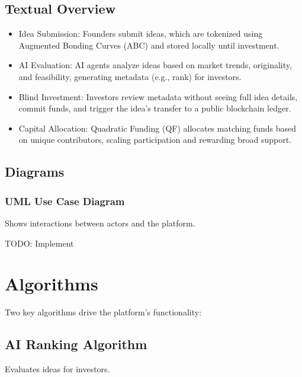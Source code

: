 \documentclass[12pt]{article}
\begin{document}
\subsection{Textual Overview}
\begin{itemize}
  \item Idea Submission: Founders submit ideas, which are tokenized using Augmented Bonding Curves (ABC) and stored locally until investment.
  \item AI Evaluation: AI agents analyze ideas based on market trends, originality, and feasibility, generating metadata (e.g., rank) for investors.
  \item Blind Investment: Investors review metadata without seeing full idea details, commit funds, and trigger the idea's transfer to a public blockchain ledger.
  \item Capital Allocation: Quadratic Funding (QF) allocates matching funds based on unique contributors, scaling participation and rewarding broad support.
\end{itemize}

\subsection{Diagrams}

\subsubsection{UML Use Case Diagram}
Shows interactions between actors and the platform.

TODO: Implement

\section{Algorithms}

Two key algorithms drive the platform's functionality:

\subsection{AI Ranking Algorithm}
Evaluates ideas for investors.
\end{document}
